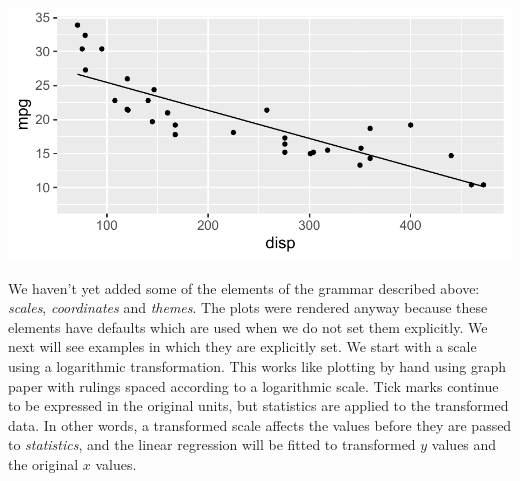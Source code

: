 \documentclass[krantz2]{krantz}\usepackage{knitr}
\begin{document}
\begin{knitrout}\footnotesize
{}\color{fgcolor}\begin{kframe}
\begin{alltt}
\hlstd{(} 
       \hlstd{(}    \hlopt{+}
  \hlstd{()} \hlopt{+}
  \hlstd{(} \hlstd{=} \hlstd{,}  \hlstd{=} \hlstd{)}
\end{alltt}
\end{kframe}

{\centering \includegraphics[width=.7\textwidth]{figure/pos-ggplot-basics-05-1} 

}



\end{knitrout}

We haven't yet added some of the elements of the grammar described above: \emph{scales}, \emph{coordinates} and \emph{themes}. The plots were rendered anyway because these elements have defaults which are used when we do not set them explicitly. We next will see examples in which they are explicitly set. We start with a scale using a logarithmic transformation. This works like plotting by hand using graph paper with rulings spaced according to a logarithmic scale. Tick marks continue to be expressed in the original units, but statistics are applied to the transformed data. In other words, a transformed scale affects the values before they are passed to \emph{statistics}, and the linear regression will be fitted to  transformed $y$ values and the original $x$ values.
\end{document}
